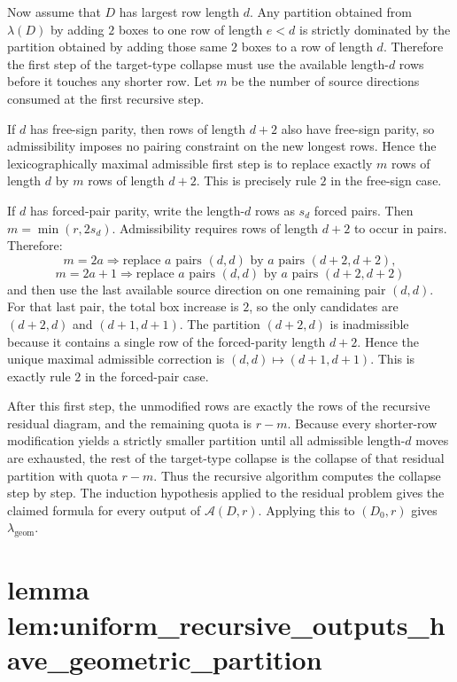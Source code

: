 \documentclass[
]{article}
\begin{document}
Now assume that \(D\) has largest row length \(d\). Any partition
obtained from \(\lambda(D)\) by adding \(2\) boxes to one row of length
\(e<d\) is strictly dominated by the partition obtained by adding those
same \(2\) boxes to a row of length \(d\). Therefore the first step of
the target-type collapse must use the available length-\(d\) rows before
it touches any shorter row. Let \(m\) be the number of source directions
consumed at the first recursive step.

If \(d\) has free-sign parity, then rows of length \(d+2\) also have
free-sign parity, so admissibility imposes no pairing constraint on the
new longest rows. Hence the lexicographically maximal admissible first
step is to replace exactly \(m\) rows of length \(d\) by \(m\) rows of
length \(d+2\). This is precisely rule \(2\) in the free-sign case.

If \(d\) has forced-pair parity, write the length-\(d\) rows as \(s_d\)
forced pairs. Then \(m=\min(r,2s_d)\). Admissibility requires rows of
length \(d+2\) to occur in pairs. Therefore: \[
m=2a \Longrightarrow \text{replace } a \text{ pairs } (d,d) \text{ by } a \text{ pairs } (d+2,d+2),
\] \[
m=2a+1 \Longrightarrow \text{replace } a \text{ pairs } (d,d) \text{ by } a \text{ pairs } (d+2,d+2)
\] and then use the last available source direction on one remaining
pair \((d,d)\). For that last pair, the total box increase is \(2\), so
the only candidates are \((d+2,d)\) and \((d+1,d+1)\). The partition
\((d+2,d)\) is inadmissible because it contains a single row of the
forced-parity length \(d+2\). Hence the unique maximal admissible
correction is \((d,d)\mapsto (d+1,d+1)\). This is exactly rule \(2\) in
the forced-pair case.

After this first step, the unmodified rows are exactly the rows of the
recursive residual diagram, and the remaining quota is \(r-m\). Because
every shorter-row modification yields a strictly smaller partition until
all admissible length-\(d\) moves are exhausted, the rest of the
target-type collapse is the collapse of that residual partition with
quota \(r-m\). Thus the recursive algorithm computes the collapse step
by step. The induction hypothesis applied to the residual problem gives
the claimed formula for every output of \(\mathcal A(D,r)\). Applying
this to \((D_0,r)\) gives \(\lambda_{\mathrm{geom}}\).

\section{lemma
lem:uniform\_recursive\_outputs\_have\_geometric\_partition}\label{lemma-lemuniform_recursive_outputs_have_geometric_partition}
\end{document}
